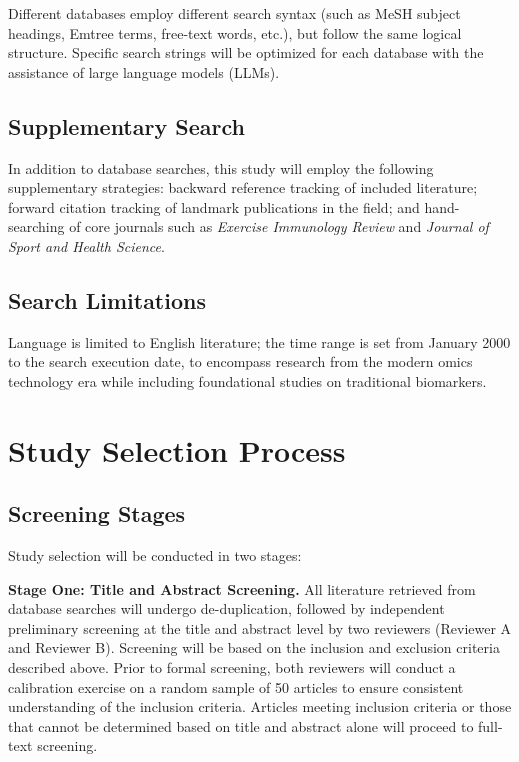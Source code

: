 \documentclass[12pt,a4paper]{article}
\begin{document}
Different databases employ different search syntax (such as MeSH subject headings, Emtree terms, free-text words, etc.), but follow the same logical structure. Specific search strings will be optimized for each database with the assistance of large language models (LLMs).

\subsection{Supplementary Search}

In addition to database searches, this study will employ the following supplementary strategies: backward reference tracking of included literature; forward citation tracking of landmark publications in the field; and hand-searching of core journals such as \textit{Exercise Immunology Review} and \textit{Journal of Sport and Health Science}.

\subsection{Search Limitations}

Language is limited to English literature; the time range is set from January 2000 to the search execution date, to encompass research from the modern omics technology era while including foundational studies on traditional biomarkers.

\section{Study Selection Process}

\subsection{Screening Stages}

Study selection will be conducted in two stages:

\textbf{Stage One: Title and Abstract Screening.} All literature retrieved from database searches will undergo de-duplication, followed by independent preliminary screening at the title and abstract level by two reviewers (Reviewer A and Reviewer B). Screening will be based on the inclusion and exclusion criteria described above. Prior to formal screening, both reviewers will conduct a calibration exercise on a random sample of 50 articles to ensure consistent understanding of the inclusion criteria. Articles meeting inclusion criteria or those that cannot be determined based on title and abstract alone will proceed to full-text screening.
\end{document}

